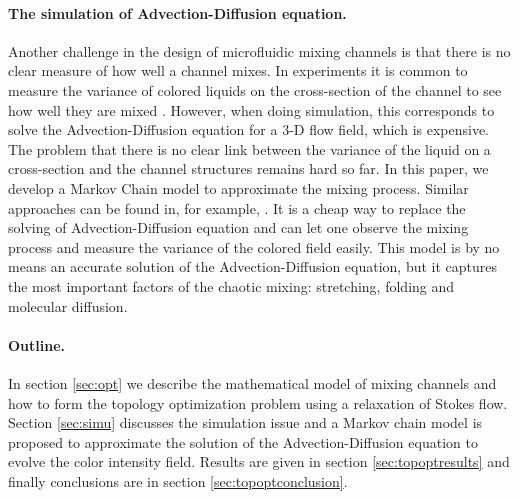 \paragraph{The simulation of Advection-Diffusion equation.}
Another challenge in the design of microfluidic mixing channels is
that there is no clear measure of how well a channel mixes. In
experiments it is common to measure the variance of colored liquids on
the cross-section of the channel to see how well they are mixed
\cite{Stroock2002}. However, when doing simulation, this corresponds
to solve the Advection-Diffusion equation for a 3-D flow field, which
is expensive. The problem that there is no clear link between the
variance of the liquid on a cross-section and the channel structures
remains hard so far. In this paper, we develop a Markov Chain model to
approximate the mixing process.  Similar approaches can be found in,
for example, \cite{Dellnitz1999, Dellnitz2002, Froyland1998,
Froyland1999, Froyland2001}. It is a cheap way to replace the solving
of Advection-Diffusion equation and can let one observe the mixing
process and measure the variance of the colored field easily. This
model is by no means an accurate solution of the Advection-Diffusion
equation, but it captures the most important factors of the chaotic
mixing: stretching, folding and molecular diffusion.

\paragraph{Outline.}
In section \ref{sec:opt} we describe the mathematical model of mixing
channels and how to form the topology optimization problem using a
relaxation of Stokes flow. Section \ref{sec:simu} discusses the
simulation issue and a Markov chain model is proposed to approximate
the solution of the Advection-Diffusion equation to evolve the color
intensity field. Results are given in section \ref{sec:topoptresults} and
finally conclusions are in section \ref{sec:topoptconclusion}.

